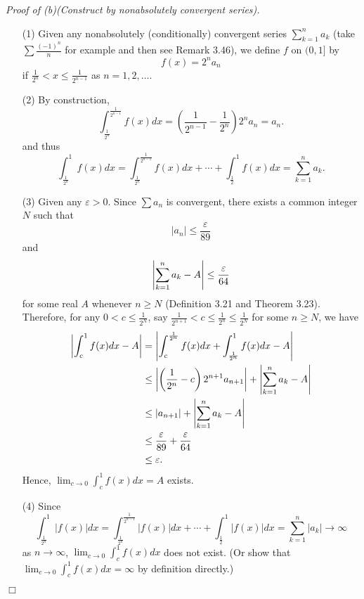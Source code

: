 \documentclass{article}
\begin{document}
\emph{Proof of (b)(Construct by nonabsolutely convergent series).}
\begin{enumerate}
\item[(1)]
Given any nonabsolutely (conditionally) convergent series $\sum_{k=1}^{n} a_k$
(take $\sum \frac{(-1)^n}{n}$ for example and then see Remark 3.46),
we define $f$ on $(0,1]$ by
\[
  f(x) = 2^{n} a_n
\]
if $\frac{1}{2^{n}} < x \leq \frac{1}{2^{n-1}}$ as $n = 1,2,\ldots$.

\item[(2)]
By construction,
\[
  \int_{\frac{1}{2^{n}}}^{\frac{1}{2^{n-1}}} f(x) dx
  = \left( \frac{1}{2^{n-1}} - \frac{1}{2^{n}}\right) 2^n a_n = a_n.
\]
and thus
\[
  \int_{\frac{1}{2^{n}}}^{1} f(x) dx
  = \int_{\frac{1}{2^{n}}}^{\frac{1}{2^{n-1}}} f(x) dx
    + \cdots
    + \int_{\frac{1}{2}}^{1} f(x) dx
  = \sum_{k=1}^{n} a_k.
\]

\item[(3)]
Given any $\varepsilon > 0$.
Since $\sum a_n$ is convergent, there exists a common integer $N$
such that
\[
  |a_n| \leq \frac{\varepsilon}{89}
\]
and
\[
  \abs{ \sum_{k=1}^{n} a_k - A } \leq \frac{\varepsilon}{64}
\]
for some real $A$ whenever $n \geq N$
(Definition 3.21 and Theorem 3.23).
Therefore, for any $0 < c \leq \frac{1}{2^N}$,
say $\frac{1}{2^{n+1}} < c \leq \frac{1}{2^n} \leq \frac{1}{2^N}$ for some $n \geq N$,
we have
\begin{align*}
  \abs{ \int_{c}^{1} f(x) dx - A }
  &= \abs{ \int_{c}^{\frac{1}{2^{n}}} f(x) dx
    + \int_{\frac{1}{2^{n}}}^{1} f(x) dx
    - A } \\
  &\leq \abs{ \left( \frac{1}{2^{n}} - c \right) 2^{n+1} a_{n+1} }
    + \abs{ \sum_{k=1}^{n} a_k - A } \\
  &\leq \abs{ a_{n+1} } + \abs{ \sum_{k=1}^{n} a_k - A } \\
  &\leq \frac{\varepsilon}{89} + \frac{\varepsilon}{64} \\
  &\leq \varepsilon.
\end{align*}
Hence, $\lim_{c \to 0} \int_{c}^{1} f(x) dx = A$ exists.

\item[(4)]
Since
\[
  \int_{\frac{1}{2^{n}}}^{1} |f(x)| dx
  = \int_{\frac{1}{2^{n}}}^{\frac{1}{2^{n-1}}} |f(x)| dx
    + \cdots
    + \int_{\frac{1}{2}}^{1} |f(x)| dx
  = \sum_{k=1}^{n} |a_k| \to \infty
\]
as $n \to \infty$,
$\lim_{c \to 0} \int_{c}^{1}f(x)dx$ does not exist.
(Or show that $\lim_{c \to 0} \int_{c}^{1}f(x)dx = \infty$ by definition directly.)
\end{enumerate}
$\Box$ \\\\
\end{document}
